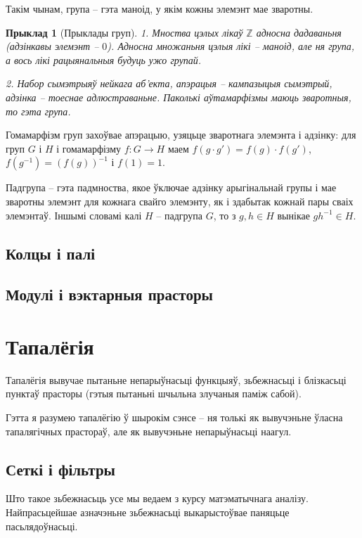 \documentclass[a4paper,12pt]{book}
\newtheorem{example}{Прыклад}[section]
\begin{document}
Такім чынам, група -- гэта маноід, у якім кожны элемэнт мае зваротны.

\begin{example}[Прыклады груп]
  1. Мноства цэлых лікаў $\mathbb{Z}$ адносна дадаваньня (адзінкавы
  элемэнт -- $0$). Адносна множаньня цэлыя лікі -- маноід, але ня
  група, а вось лікі рацыянальныя будуць ужо групай.

  2. Набор сымэтрыяў нейкага аб'екта, апэрацыя -- кампазыцыя сымэтрый,
  адзінка -- тоеснае адлюстраваньне. Паколькі аўтамарфізмы маюць
  зваротныя, то гэта група.
\end{example}

Гомамарфізм груп захоўвае апэрацыю, узяцьце зваротнага элемэнта і
адзінку: для груп $G$ і $H$ і гомамарфізму $f:G \rightarrow H$ маем
$f(g \cdot g') = f(g) \cdot
f(g')$, $f(g^{-1}) = (f(g))^{-1}$ і $f(1) = 1$.

Падгрупа -- гэта падмноства, якое ўключае адзінку арыгінальнай
групы і мае зваротны элемэнт для кожнага свайго элемэнту, як і
здабытак кожнай пары сваіх элемэнтаў. Іншымі словамі калі $H$ -- падгрупа
$G$, то з $g, h \in H$ вынікае $g h^{-1} \in H$.

\subsection{Колцы і палі}

\subsection{Модулі і вэктарныя прасторы}

\section{Тапалёгія}

Тапалёгія вывучае пытаньне непарыўнасьці функцыяў, зьбежнасьці і
блізкасьці пунктаў прасторы
(гэтыя пытаньні шчыльна злучаныя паміж сабой).

Гэтта я разумею тапалёгію ў шырокім сэнсе -- ня толькі як вывучэньне
ўласна тапалягічных прастораў, але як вывучэньне непарыўнасьці
наагул.

\subsection{Сеткі і фільтры}

Што такое зьбежнасьць усе мы ведаем з курсу матэматычнага
аналізу. Найпрасьцейшае азначэньне зьбежнасьці выкарыстоўвае паняцьце
пасьлядоўнасьці.
\end{document}
